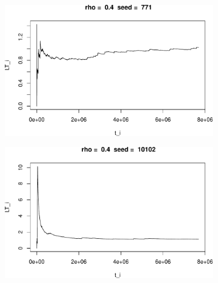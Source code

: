 \documentclass[]{article}
\begin{document}
\begin{figure}[h!]
\begin{subfigure}[b]{.55\linewidth}

\includegraphics[width=\linewidth]{003_files/figure-latex/unnamed-chunk-14-1.pdf}
\end{subfigure}\hfill
\begin{subfigure}[b]{.55\linewidth}
\includegraphics[width=\linewidth]{003_files/figure-latex/unnamed-chunk-14-2.pdf}
\end{subfigure}\vfill
\end{figure}
\end{document}
